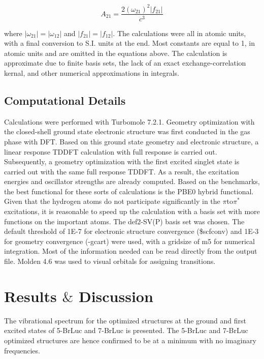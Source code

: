 \documentclass[11pt]{article}
\begin{document}
\begin{equation}
  \label{eq:EinsteinCoeff}
  A_{21} = \frac {2(\omega_{21})^2 |f_{21}|} {c^3}
\end{equation}

where $|\omega_{21}|= |\omega_{12}| $ 
and $|f_{21}|= |f_{12}| $. The calculations were all
in atomic units, with a final conversion to S.I. units
at the end. Most constants are equal to 1, in atomic units
and are omitted in the equations above. The calculation is
approximate due to finite basis sets, the lack of an exact
exchange-correlation kernal, and other numerical
approximations in integrals.

\subsection{Computational Details}

Calculations were performed with {\sc Turbomole}
7.2.1\cite{TURBOMOLE}. Geometry optimization with
the closed-shell ground state electronic structure
was first conducted in the gas phase with DFT.
Based on this ground state geometry and electronic structure, a
linear response TDDFT calculation with full response is carried
out. Subsequently, a geometry optimization with the first excited
singlet state is carried out with the same full response TDDFT.
As a result, the excitation energies and oscillator strengths
are already computed. Based on the benchmarks, the best
functional for these sorts of calculations is the PBE0 hybrid
functional\cite{doi:10.1063/1.478522}. Given that the hydrogen
atoms do not participate significantly in the $\pi$to$\pi^*$ excitations,
it is reasonable to speed up the calculation with a basis set
with more functions on the important atoms. The def2-SV(P) basis
set was chosen\cite{Weigend.F:PCCP.2005}. The default threshold of
1E-7 for electronic structure convergence (\$scfconv) and 1E-3
for geometry convergence (-gcart) were used, with a gridsize
of m5 for numerical integration.\cite{Treutler95a}
Most of the information needed can be read directly from the
output file. Molden 4.6 was used to visual orbitals for
assigning transitions.

\section{Results $\&$ Discussion}

The vibrational spectrum for the optimized structures
at the ground and first excited states of 5-BrLuc and 7-BrLuc
is presented. The 5-BrLuc and 7-BrLuc optimized structures
are hence confirmed to be at a minimum with no imaginary frequencies.
\end{document}
